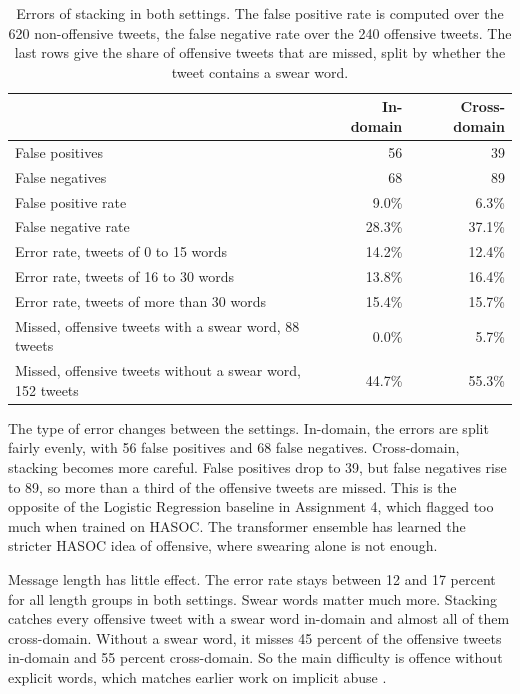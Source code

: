 \documentclass[11pt,a4paper]{article}
\begin{document}
\begin{table}[H]
\centering
\caption{Errors of stacking in both settings. The false positive rate is computed over the 620 non-offensive tweets, the false negative rate over the 240 offensive tweets. The last rows give the share of offensive tweets that are missed, split by whether the tweet contains a swear word.}
\label{tab:errors}
\begin{tabular}{lrr}
\toprule
 & In-domain & Cross-domain \\
\midrule
False positives & 56 & 39 \\
False negatives & 68 & 89 \\
False positive rate & 9.0\% & 6.3\% \\
False negative rate & 28.3\% & 37.1\% \\
\midrule
Error rate, tweets of 0 to 15 words & 14.2\% & 12.4\% \\
Error rate, tweets of 16 to 30 words & 13.8\% & 16.4\% \\
Error rate, tweets of more than 30 words & 15.4\% & 15.7\% \\
\midrule
Missed, offensive tweets with a swear word, 88 tweets & 0.0\% & 5.7\% \\
Missed, offensive tweets without a swear word, 152 tweets & 44.7\% & 55.3\% \\
\bottomrule
\end{tabular}
\end{table}

The type of error changes between the settings. In-domain, the errors are split fairly evenly, with 56 false positives and 68 false negatives. Cross-domain, stacking becomes more careful. False positives drop to 39, but false negatives rise to 89, so more than a third of the offensive tweets are missed. This is the opposite of the Logistic Regression baseline in Assignment 4, which flagged too much when trained on HASOC. The transformer ensemble has learned the stricter HASOC idea of offensive, where swearing alone is not enough.

Message length has little effect. The error rate stays between 12 and 17 percent for all length groups in both settings. Swear words matter much more. Stacking catches every offensive tweet with a swear word in-domain and almost all of them cross-domain. Without a swear word, it misses 45 percent of the offensive tweets in-domain and 55 percent cross-domain. So the main difficulty is offence without explicit words, which matches earlier work on implicit abuse \citep{caselli2020feel}.
\end{document}
